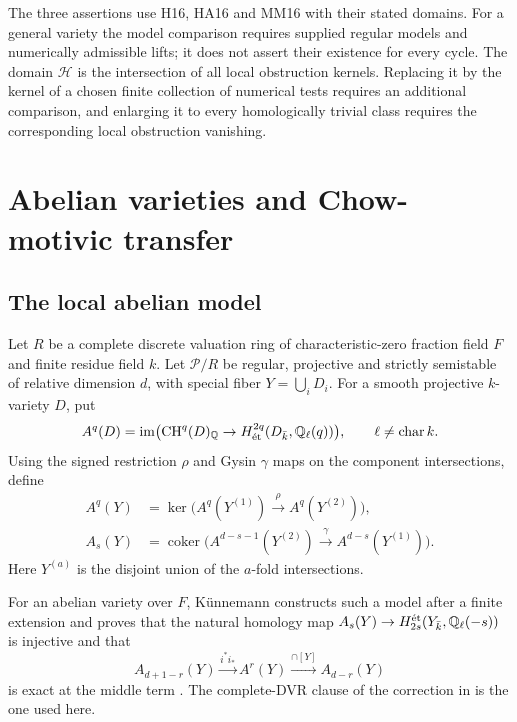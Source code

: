 \documentclass[11pt,a4paper]{article}
\theoremstyle{definition}
\theoremstyle{remark}\newtheorem{remark}[theorem]{Remark}
\numberwithin{equation}{section}
\newcommand{\Q}{\mathbb Q}\newcommand{\R}{\mathbb R}\newcommand{\C}{\mathbb C}
\newcommand{\CH}{\operatorname{CH}}\newcommand{\an}{\mathrm{an}}
\begin{document}
The three assertions use H16, HA16 and MM16 with their stated domains.
For a general variety the model comparison requires supplied regular
models and numerically admissible lifts; it does not assert their
existence for every cycle. The domain $\mathcal H$ is the intersection
of all local obstruction kernels. Replacing it by the kernel of a
chosen finite collection of numerical tests requires an additional
comparison, and enlarging it to every homologically trivial class
requires the corresponding local obstruction vanishing.

\section{Abelian varieties and Chow-motivic transfer}\label{sec:transfer}

\subsection{The local abelian model}

Let $R$ be a complete discrete valuation ring of characteristic-zero
fraction field $F$ and finite residue field $k$. Let $\mathcal P/R$ be
regular, projective and strictly semistable of relative dimension $d$,
with special fiber $Y=\bigcup_iD_i$. For a smooth projective
$k$-variety $D$, put
\[
 A^q(D)=\operatorname{im}\bigl(\CH^q(D)_\Q\to
 H^{2q}_{\textnormal{ét}}(D_{\bar k},\Q_\ell(q))\bigr),
 \qquad \ell\ne\operatorname{char}k.
\]
Using the signed restriction $\rho$ and Gysin $\gamma$ maps on the
component intersections, define
\begin{align*}
 A^q(Y)&=\ker\bigl(A^q(Y^{(1)})\xrightarrow{\rho}A^q(Y^{(2)})\bigr),\\
 A_s(Y)&=\operatorname{coker}\bigl(
 A^{d-s-1}(Y^{(2)})\xrightarrow{\gamma}A^{d-s}(Y^{(1)})\bigr).
\end{align*}
Here $Y^{(a)}$ is the disjoint union of the $a$-fold intersections.

For an abelian variety over $F$, K\"unnemann constructs such a model
after a finite extension and proves that the natural homology map
$A_s(Y)\to H^{\textnormal{ét}}_{2s}(Y_{\bar k},\Q_\ell(-s))$
is injective and that
\begin{equation}\label{eq:kun-complex}
 A_{d+1-r}(Y)\xrightarrow{i^*i_*}A^r(Y)
                  \xrightarrow{\cap[Y]}A_{d-r}(Y)
\end{equation}
is exact at the middle term \cite[Theorems 5.6 and 6.6]{Kun}.
The complete-DVR clause of the correction in \cite[\S5.8]{Kun}
is the one used here.
\end{document}
